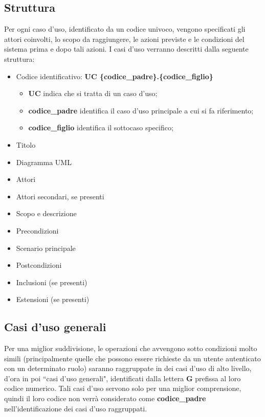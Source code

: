 \subsection{Struttura}
Per ogni caso d'uso, identificato da un codice univoco, vengono specificati gli attori coinvolti, lo scopo da raggiungere, le azioni previste e le condizioni del sistema prima e dopo tali azioni. I casi d'uso verranno descritti dalla seguente struttura:
\begin{itemize}
    \item Codice identificativo: \textbf{UC \{codice\_padre\}.\{codice\_figlio\}}
        \vspace{-5pt}
        \begin{itemize}
            \item \textbf{UC} indica che si tratta di un caso d'uso;
            \item \textbf{codice\_padre} identifica il caso d'uso principale a cui si fa riferimento;
            \item \textbf{codice\_figlio} identifica il sottocaso specifico;
        \end{itemize}
        \vspace{-5pt}
    \item Titolo
    \item Diagramma UML
    \item Attori
    \item Attori secondari, se presenti
    \item Scopo e descrizione
    \item Precondizioni
    \item Scenario principale
    \item Postcondizioni
    \item Inclusioni (se presenti)
    \item Estensioni (se presenti)
\end{itemize}
\subsection{Casi d'uso generali}
Per una miglior suddivisione, le operazioni che avvengono sotto condizioni molto simili (principalmente quelle che possono essere richieste da un utente autenticato con un determinato ruolo) saranno raggruppate in dei casi d'uso di alto livello, d'ora in poi ``casi d'uso generali", identificati dalla lettera \textbf{G} prefissa al loro codice numerico. Tali casi d'uso servono solo per una miglior comprensione, quindi il loro codice non verrà considerato come \textbf{codice\_padre} nell'identificazione dei casi d'uso raggruppati.

